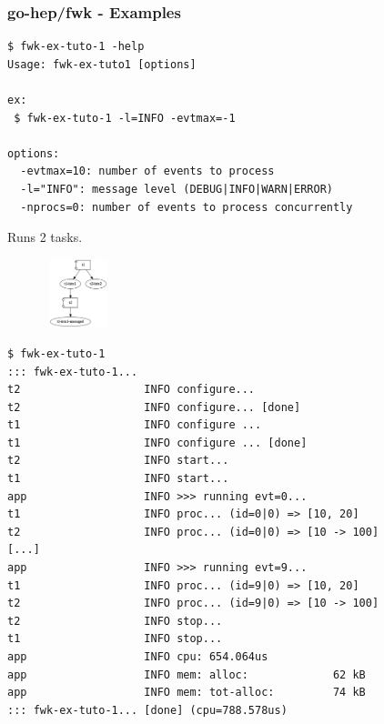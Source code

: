 \documentclass[9pt]{beamer}
\begin{document}
\begin{frame}[fragile]
\frametitle{go-hep/fwk - Examples}


	\begin{block}{}
\begin{verbatim}
$ fwk-ex-tuto-1 -help
Usage: fwk-ex-tuto1 [options]

ex:
 $ fwk-ex-tuto-1 -l=INFO -evtmax=-1

options:
  -evtmax=10: number of events to process
  -l="INFO": message level (DEBUG|INFO|WARN|ERROR)
  -nprocs=0: number of events to process concurrently

\end{verbatim}
	\end{block}{}


Runs 2 tasks.


\begin{figure}[h]
\begin{center}
\includegraphics[width=2cm,height=2cm]{_figs/fwk-ex1-dflow.png}
\end{center}

\end{figure}


\end{frame}

\begin{frame}[fragile]

\begin{verbatim}
$ fwk-ex-tuto-1
::: fwk-ex-tuto-1...
t2                   INFO configure...
t2                   INFO configure... [done]
t1                   INFO configure ...
t1                   INFO configure ... [done]
t2                   INFO start...
t1                   INFO start...
app                  INFO >>> running evt=0...
t1                   INFO proc... (id=0|0) => [10, 20]
t2                   INFO proc... (id=0|0) => [10 -> 100]
[...]
app                  INFO >>> running evt=9...
t1                   INFO proc... (id=9|0) => [10, 20]
t2                   INFO proc... (id=9|0) => [10 -> 100]
t2                   INFO stop...
t1                   INFO stop...
app                  INFO cpu: 654.064us
app                  INFO mem: alloc:             62 kB
app                  INFO mem: tot-alloc:         74 kB
::: fwk-ex-tuto-1... [done] (cpu=788.578us)

\end{verbatim}


\end{frame}
\end{document}

